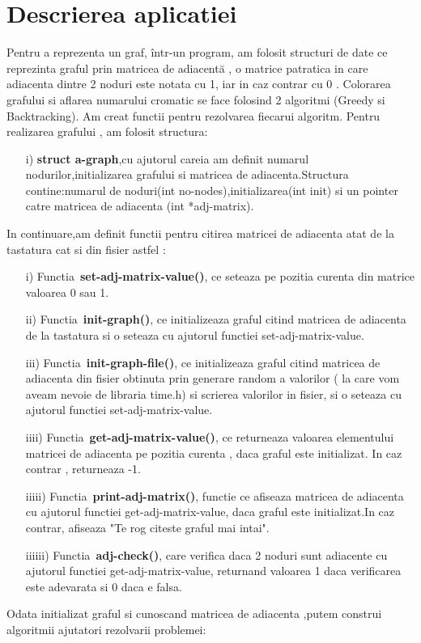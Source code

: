 \documentclass[12pt]{article}
\begin{document}
\section{Descrierea aplicatiei}
Pentru a reprezenta un graf, într-un program, am folosit structuri de date ce reprezinta graful prin matricea de adiacentă , o matrice patratica in care adiacenta dintre 2 noduri este notata cu 1, iar in caz contrar cu 0 . Colorarea grafului si aflarea numarului cromatic se face folosind 2 algoritmi (Greedy si Backtracking). Am creat functii pentru rezolvarea fiecarui algoritm.
Pentru realizarea grafului , am folosit structura:
\begin{itemize}
  \item [i)]{\bf struct a-graph},cu ajutorul careia am definit numarul nodurilor,initializarea grafului si matricea de adiacenta.Structura contine:numarul de noduri(int no-nodes),initializarea(int init) si un pointer catre matricea de adiacenta (int *adj-matrix).
\end{itemize}
In continuare,am definit functii pentru citirea matricei de adiacenta atat de la tastatura cat si din fisier astfel :
\begin{itemize}
  \item [i)]Functia\ {\bf set-adj-matrix-value()}, ce seteaza pe pozitia curenta din matrice valoarea 0 sau 1.
  \item [ii)]Functia\ {\bf init-graph()}, ce initializeaza graful citind matricea de adiacenta de la tastatura si o seteaza cu ajutorul functiei set-adj-matrix-value.
  \item [iii)]Functia\ {\bf init-graph-file()}, ce initializeaza graful citind matricea de adiacenta din fisier obtinuta prin generare random a valorilor ( la care vom aveam nevoie de libraria time.h) si scrierea valorilor in fisier, si o seteaza cu ajutorul functiei set-adj-matrix-value.
  \item [iiii)]Functia\ {\bf get-adj-matrix-value()}, ce returneaza valoarea elementului matricei de adiacenta pe pozitia curenta , daca graful este initializat. In caz contrar , returneaza -1.
   \item [iiiii)]Functia\ {\bf print-adj-matrix()}, functie ce afiseaza matricea de adiacenta cu ajutorul functiei get-adj-matrix-value, daca graful este initializat.In caz contrar, afiseaza "Te rog citeste graful mai intai".
  \item [iiiiii)]Functia\ {\bf adj-check()}, care verifica daca 2 noduri sunt adiacente cu ajutorul functiei get-adj-matrix-value, returnand valoarea 1 daca verificarea este adevarata si 0 daca e falsa.
\end{itemize}
Odata initializat graful si cunoscand matricea de adiacenta ,putem construi algoritmii ajutatori rezolvarii problemei:
\end{document}
